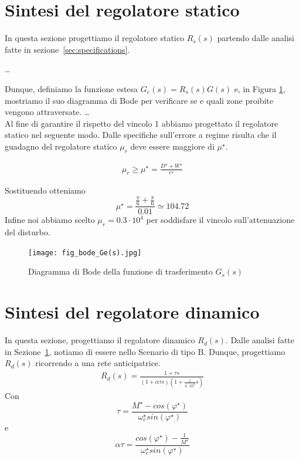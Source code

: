 \documentclass[a4paper, 11pt]{article}
\begin{document}
\section{Sintesi del regolatore statico}
\label{sec:static_regulator}

In questa sezione progettiamo il regolatore statico $R_s(s)$ partendo dalle analisi fatte in sezione~\ref{sec:specifications}.

\dots

Dunque, definiamo la funzione estesa $G_e(s) = R_s(s)G(s)$ e, in Figura \ref{fig:bode3}, mostriamo il suo diagramma di Bode per verificare se e quali zone proibite vengono attraversate.
\dots
\\
Al fine di garantire il rispetto del vincolo 1 abbiamo progettato il regolatore statico nel seguente modo. 
Dalle specifiche sull'errore a regime risulta che il guadagno del regolatore statico $\mu _r $ deve essere maggiore di $\mu^{\star}$. 

%
\begin{subequations}\label{eq:mu_r}
\begin{align}
\mu_r \geq  \mu^{\star} = \frac{D^{\star} + W^{\star}}{e^{\star}}
\end{align}
\end{subequations}
%

Sostituendo otteniamo 
$$
\mu^{\star} = \frac{\frac{\pi}{6} + \frac{\pi}{6}}{0.01} \simeq 104.72
$$
Infine noi abbiamo scelto $\mu_r = 0.3 \cdot 10^4$ per soddisfare il vincolo sull'attenuazione del disturbo. 

\begin{figure}[h]
\centering
\texttt{[image: fig\_bode\_Ge(s).jpg]}
\caption{Diagramma di Bode della funzione di trasferimento $G_s(s)$}
\label{fig:bode3}
\end{figure}


\section{Sintesi del regolatore dinamico}

In questa sezione, progettiamo il regolatore dinamico $R_d(s)$. 
%
Dalle analisi fatte in Sezione~\ref{sec:static_regulator}, notiamo di essere nello Scenario di tipo B. Dunque, progettiamo $R_d(s)$ ricorrendo a una rete anticipatrice.
%
\begin{subequations}\label{eq:reg_dinamico}
\begin{align}
R_d(s) = \frac{1 + \tau s}{(1 + \alpha \tau s)(1 + \frac{1}{4 \cdot 10^2}s)}
\end{align}
\end{subequations}
%
Con 
$$
\tau = \frac{M^{\star} - cos(\varphi^{\star})}{\omega_c^{\star} sin(\varphi^{\star})}
$$
e 
$$
\alpha \tau = \frac{cos(\varphi^{\star}) - \frac{1}{M^{\star}}}{\omega_c^{\star} sin(\varphi^{\star})}
$$
\end{document}
